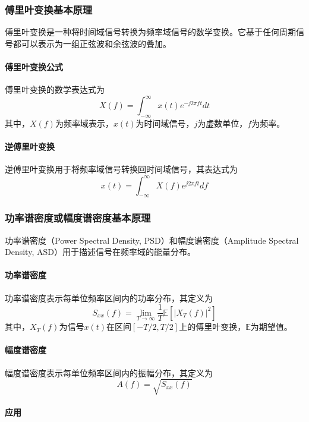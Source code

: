 \documentclass[dvipsnames, svgnames,a4paper,11pt]{article}
\begin{document}
    \subsubsection{傅里叶变换基本原理}

        傅里叶变换是一种将时间域信号转换为频率域信号的数学变换。它基于任何周期信号都可以表示为一组正弦波和余弦波的叠加。

        \paragraph*{傅里叶变换公式}

        傅里叶变换的数学表达式为
        \[ X(f) = \int_{-\infty}^{\infty} x(t) e^{-j 2 \pi f t} dt \]
        其中，$X(f)$为频率域表示，$x(t)$为时间域信号，$j$为虚数单位，$f$为频率。

        \paragraph*{逆傅里叶变换}

        逆傅里叶变换用于将频率域信号转换回时间域信号，其表达式为
        \[ x(t) = \int_{-\infty}^{\infty} X(f) e^{j 2 \pi f t} df \]

    \subsubsection*{功率谱密度或幅度谱密度基本原理}

    功率谱密度（Power Spectral Density, PSD）和幅度谱密度（Amplitude Spectral Density, ASD）用于描述信号在频率域的能量分布。

        \paragraph*{功率谱密度}

        功率谱密度表示每单位频率区间内的功率分布，其定义为
        \[ S_{xx}(f) = \lim_{T \to \infty} \frac{1}{T} \mathbb{E} \left[ \left| X_T(f) \right|^2 \right] \]
        其中，$X_T(f)$为信号$x(t)$在区间$[-T/2, T/2]$上的傅里叶变换，$\mathbb{E}$为期望值。

        \paragraph*{幅度谱密度}

        幅度谱密度表示每单位频率区间内的振幅分布，其定义为
        \[ A(f) = \sqrt{S_{xx}(f)} \]

        \paragraph*{应用}
\end{document}
